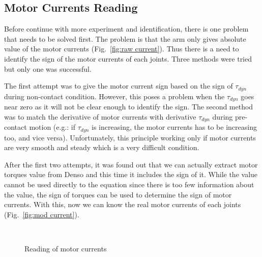 \documentclass[letterpaper, 10 pt, conference]{ieeeconf}
\newcommand{\fref}[1]{Fig.~\ref{#1}}
\begin{document}
\subsection{Motor Currents Reading}
Before continue with more experiment and identification, there is one problem that needs to be solved first. The problem is that the arm only gives absolute value of the motor currents (\fref{fig:raw current}). Thus there is a need to identify the sign of the motor currents of each joints. Three methods were tried but only one was successful.

The first attempt was to give the motor current sign based on the sign of $\tau_{dyn}$ during non-contact condition. However, this poses a problem when the $\tau_{dyn}$ goes near zero as it will not be clear enough to identify the sign. The second method was to match the derivative of motor currents with derivative $\tau_{dyn}$ during pre-contact motion (e.g.: if $\tau_{dyn}$ is increasing, the motor currents has to be increasing too, and vice versa). Unfortunately, this principle working only if motor currents are very smooth and steady which is a very difficult condition.

After the first two attempts, it was found out that we can actually extract motor torques value from Denso and this time it includes the sign of it. While the value cannot be used directly to the equation since there is too few information about the value, the sign of torques can be used to determine the sign of motor currents. With this, now we can know the real motor currents of each joints (\fref{fig:mod current}).

\begin{figure}
  \centering
  \,
  \,
  \caption{Reading of motor currents}
\end{figure}
\end{document}
